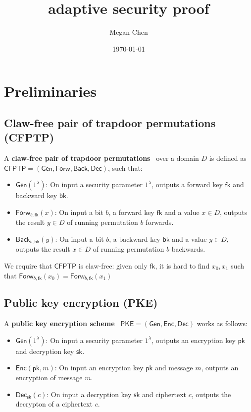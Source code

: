 \documentclass[11pt,letterpaper]{article}
\title{\cite{CanettiF01} adaptive security proof}
\author{Megan Chen}
\date{\today}
\renewcommand{\emph}[1]{\textbf{#1}~}
\newcommand{\doclearpage}{%
  \iffull\clearpage\else\fi
}
\theoremstyle{plain} %
\theoremstyle{definition} %
\theoremstyle{remark} %
\newcommand{\Input}{x}
\newcommand{\SecParam}{\lambda}
\newcommand{\PKE}{\mathsf{PKE}}
\newcommand{\Gen}{\mathsf{Gen}}
\newcommand{\Enc}{\mathsf{Enc}}
\newcommand{\Dec}{\mathsf{Dec}}
\newcommand{\EncKey}{\mathsf{pk}}
\newcommand{\DecKey}{\mathsf{sk}}
\newcommand{\Msg}{m}
\newcommand{\Ciphertext}{c}
\newcommand{\CFPTP}{\mathsf{CFPTP}}
\newcommand{\Forw}{\mathsf{Forw}}
\newcommand{\Back}{\mathsf{Back}}
\newcommand{\ForwKey}{\mathsf{fk}}
\newcommand{\BackKey}{\mathsf{bk}}
\newcommand{\Domain}{D}
\newcommand{\CFPTPInput}{\Input}
\newcommand{\CFPTPOutput}{y}
\newcommand{\CFPTPBit}{b}
\begin{document}
\maketitle
\tableofcontents

\doclearpage
\section{Preliminaries}
\label{sec:preliminaries}

\subsection{Claw-free pair of trapdoor permutations (CFPTP)}
A \emph{claw-free pair of trapdoor permutations} over a domain $\Domain$ is defined as $\CFPTP = (\Gen, \Forw, \Back, \Dec)$, such that:
\begin{itemize}
	\item $\Gen(1^\SecParam)$: On input a security parameter $1^\SecParam$, outputs a forward key $\ForwKey$ and backward key $\BackKey$.
	\item $\Forw_{\CFPTPBit, \ForwKey}(\CFPTPInput)$: On input a bit $\CFPTPBit$, a forward key $\ForwKey$ and a value $\Input \in \Domain$, outputs the result $\CFPTPOutput \in \Domain$ of running permutation $\CFPTPBit$ forwards.
	\item $\Back_{\CFPTPBit, \BackKey}(\CFPTPOutput)$: On input a bit $\CFPTPBit$, a backward key $\BackKey$ and a value $\CFPTPOutput \in \Domain$, outputs the result $\Input \in \Domain$ of running permutation $b$ backwards.
\end{itemize}
We require that $\CFPTP$ is claw-free: given only $\ForwKey$, it is hard to find $\CFPTPInput_0, \CFPTPInput_1$ such that $\Forw_{\CFPTPBit, \ForwKey}(\CFPTPInput_0) = \Forw_{\CFPTPBit, \ForwKey}(\CFPTPInput_1)$

\subsection{Public key encryption (PKE)}

A \emph{public key encryption scheme} $\PKE = (\Gen, \Enc, \Dec)$ works as follows:
\begin{itemize}
	\item $\Gen(1^\SecParam)$: On input a security parameter $1^\SecParam$, outputs an encryption key $\EncKey$ and decryption key $\DecKey$.
	\item $\Enc(\EncKey,\Msg)$: On input an encryption key $\EncKey$ and message $\Msg$, outputs an encryption of message $\Msg$.
	\item $\Dec_{\DecKey}(\Ciphertext)$: On input a decryption key $\DecKey$ and ciphertext $\Ciphertext$, outputs the decrypton of a ciphertext $\Ciphertext$.
\end{itemize}
\end{document}
